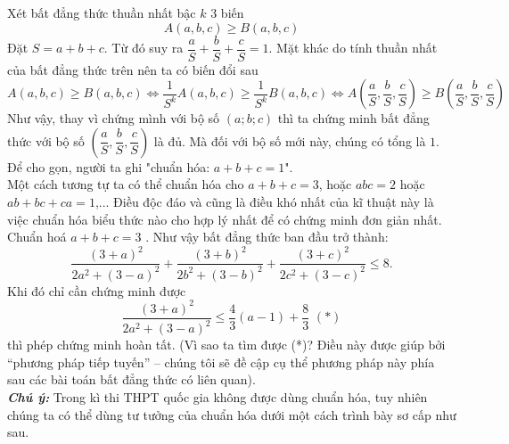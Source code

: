 Xét bất đẳng thức thuần nhất bậc $k$ 3 biến
\[A\left( {a,b,c} \right) \ge B\left( {a,b,c} \right)\]
Đặt $S=a+b+c$. Từ đó suy ra $\dfrac{a}{S} + \dfrac{b}{S} + \dfrac{c}{S} = 1$. Mặt khác do tính thuần nhất của bất đẳng thức trên nên ta có biến đổi sau
\[A\left( {a,b,c} \right) \ge B\left( {a,b,c} \right)
\Leftrightarrow \dfrac{1}{{{S^k}}}A\left( {a,b,c} \right) \ge \dfrac{1}{{{S^k}}}B\left( {a,b,c} \right)
\Leftrightarrow A\left( {\dfrac{a}{S},\dfrac{b}{S},\dfrac{c}{S}} \right) \ge B\left( {\dfrac{a}{S},\dfrac{b}{S},\dfrac{c}{S}} \right) \]
Như vậy, thay vì chứng mình với bộ số $(a;b;c)$ thì ta chứng minh bất đẳng thức với bộ số $\left( {\dfrac{a}{S},\dfrac{b}{S},\dfrac{c}{S}} \right)$ là đủ. Mà đối với bộ số mới này, chúng có tổng là $1$. Để cho gọn, người ta ghi "chuẩn hóa: $a+b+c=1$".\\
Một cách tương tự ta có thể chuẩn hóa cho $a+b+c=3$, hoặc $abc=2$ hoặc $ab+bc+ca=1$,... Điều độc đáo và cũng là điều khó nhất của kĩ thuật này là việc chuẩn hóa biểu thức nào cho hợp lý nhất để có chứng minh đơn giản nhất.
\hda  Chuẩn hoá $a+b+c=3$ . Như vậy bất đẳng thức ban đầu trở thành: 
\[\frac{{{\left( 3+a \right)}^{2}}}{2{{a}^{2}}+{{\left( 3-a \right)}^{2}}}+\frac{{{\left( 3+b \right)}^{2}}}{2{{b}^{2}}+{{\left( 3-b \right)}^{2}}}+\frac{{{\left( 3+c \right)}^{2}}}{2{{c}^{2}}+{{\left( 3-c \right)}^{2}}}\le 8.\]
Khi đó chỉ cần chứng minh được \[\frac{{{\left( 3+a \right)}^{2}}}{2{{a}^{2}}+{{\left( 3-a \right)}^{2}}}\le \frac{4}{3}\left( a-1 \right)+\frac{8}{3}\,\,\left( * \right)\] thì phép chứng minh hoàn tất. (Vì sao ta tìm được (*)? Điều này được giúp bởi “phương pháp tiếp tuyến” – chúng tôi sẽ đề cập cụ thể phương pháp này phía sau các bài toán bất đẳng thức có liên quan).\\
\textbf{\textit{Chú ý:}} Trong kì thi THPT quốc gia không được dùng chuẩn hóa, tuy nhiên chúng ta có thể dùng tư tưởng của chuẩn hóa dưới một cách trình bày sơ cấp như sau.

